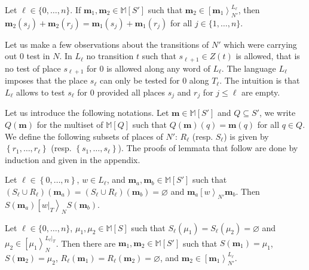 \documentclass{fsttcs}
\def\set#1{{\left\{ #1 \right\}}}
\newcommand{\multiset}[1]{{\mathbb{M}[ #1 ]}}
\def\mmap{\mathbf{m}}
\newcommand{\fire}[1]{\left[ {#1}\right\rangle}
\begin{document}
\begin{lemma}
\label{sec5.lem7}
Let $\ell \in \{0,\ldots,n\}$. If $\mmap_1, \mmap_2 \in \multiset{S'}$ such
that $\mmap_2 \in \fire{\mmap_{1}}^{L_\ell}_{N'}$, then
$\mmap_2(s_j)+\mmap_2(r_j)=\mmap_1(s_j)+\mmap_1(r_j)$  for all $j \in
\{1,\ldots,n\}$.
\end{lemma}Let us make a few observations about the transitions of \(N'\) which were
carrying out 0 test in \(N\). In \(L_{\ell}\) no transition \(t\) such that
\(s_{\ell+1}\in Z(t)\) is allowed, that is no test of place \(s_{\ell+1}\) for
\(0\) is allowed along any word of \(L_{\ell}\). The language \(L_{\ell}\)
imposes that the place \(s_{\ell}\) can only be tested for \(0\) along
\(T_{\ell}\). The intuition is that \(L_{\ell}\) allows to test
\(s_{\ell}\) for \(0\) provided all places $s_j$ and $r_j$ for $j \leq \ell$
are empty.

Let us introduce the following notations. Let \(\mmap\in\multiset{S'}\) and
\(Q\subseteq S'\), we write \(Q(\mmap)\) for the multiset of \(\multiset{Q}\)
such that \(Q(\mmap)(q)=\mmap(q)\) for all \(q\in Q\).  We define the following
subsets of places of \(N'\): \(R_{\ell}\) (resp.  \(S_{\ell}\)) is given by
\(\set{r_1,\ldots,r_{\ell}}\) (resp.  \(\set{s_1,\ldots,s_{\ell}}\)).  The proofs of lemmata that follow
are done by induction and given in the appendix.

\begin{lemma}
\label{sec5.lem8}
Let \(\ell\in\set{0,\ldots,n}\), \(w\in L_{\ell}\), and
\(\mmap_a,\mmap_b\in\multiset{S'}\) such that \linebreak \((S_{\ell}\cup
R_{\ell})(\mmap_a)=(S_{\ell}\cup
R_{\ell})(\mmap_b)=\varnothing\) and $\mmap_{a}\fire{w}_{N'} \mmap_b$. Then   $S(\mmap_a)
\fire{w|_{T}}_{N} S(\mmap_{b})$.
\end{lemma}




\begin{lemma}
\label{sec5.lem9}
Let $\ell \in \{0,\ldots,n\}$, $\mu_1, \mu_2 \in \multiset{S}$ such that  $S_{\ell}(\mu_1)=S_{\ell}(\mu_2)=\varnothing$ and  $\mu_2 \in \fire{\mu_1}^{L_\ell|_T}_N$. Then there are $\mmap_1, \mmap_2  \in \multiset{S'}$ such that $S(\mmap_1)=\mu_1$, $S(\mmap_2)=\mu_2$, $R_{\ell}(\mmap_1)=R_{\ell}(\mmap_2)=\varnothing$, and   $\mmap_2 \in \fire{\mmap_{1}}^{L_\ell}_{N'}$.
\end{lemma}
\end{document}

